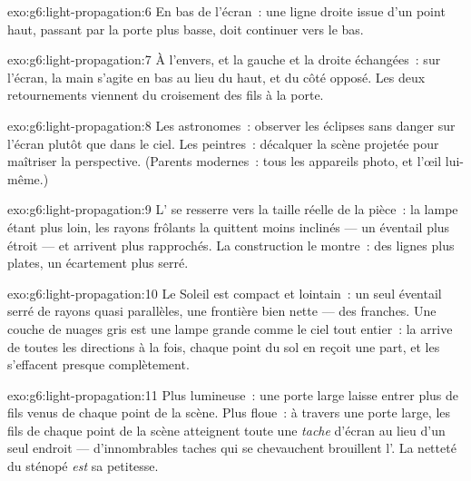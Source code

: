 \begin{solution}{exo:g6:light-propagation:6}
En bas de l'écran~: une ligne droite issue d'un point haut, passant
par la porte plus basse, doit continuer vers le bas.
\end{solution}

\begin{solution}{exo:g6:light-propagation:7}
À l'envers, et la gauche et la droite échangées~: sur l'écran, la
main s'agite en bas au lieu du haut, et du côté opposé. Les deux
retournements viennent du croisement des fils à la porte.
\end{solution}

\begin{solution}{exo:g6:light-propagation:8}
Les astronomes~: observer les éclipses sans danger sur l'écran plutôt
que dans le ciel. Les peintres~: décalquer la scène projetée pour
maîtriser la perspective. (Parents modernes~: tous les appareils
photo, et l'œil lui-même.)
\end{solution}

\begin{solution}{exo:g6:light-propagation:9}
L' se resserre vers la taille réelle de la pièce~: la lampe
étant plus loin, les rayons frôlants la quittent moins inclinés ---
un éventail plus étroit --- et arrivent plus rapprochés. La
construction le montre~: des lignes plus plates, un écartement plus
serré.
\end{solution}

\begin{solution}{exo:g6:light-propagation:10}
Le Soleil est compact et lointain~: un seul éventail serré de rayons
quasi parallèles, une frontière bien nette --- des  franches.
Une couche de nuages gris est une lampe grande comme le ciel tout
entier~: la  arrive de toutes les directions à la fois, chaque
point du sol en reçoit une part, et les  s'effacent presque
complètement.
\end{solution}

\begin{solution}{exo:g6:light-propagation:11}
Plus lumineuse~: une porte large laisse entrer plus de fils venus de
chaque point de la scène. Plus floue~: à travers une porte large, les
fils de chaque point de la scène atteignent toute une \emph{tache}
d'écran au lieu d'un seul endroit --- d'innombrables taches qui se
chevauchent brouillent l'. La netteté du sténopé \emph{est} sa
petitesse.
\end{solution}

